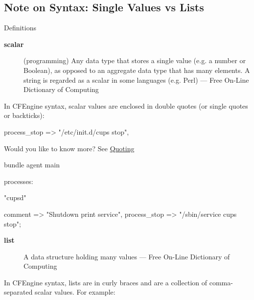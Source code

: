 \subsection{Note on Syntax: Single Values vs Lists}

Definitions

\begin{description}
\item[\textbf{scalar}] (programming) Any data type that stores a single value (e.g. a number or Boolean), as opposed to an aggregate data type that has many elements. A string is regarded as a scalar in some languages (e.g. Perl)  --- Free On-Line Dictionary of Computing
\end{description}

In CFEngine syntax, scalar values are enclosed in double quotes (or single quotes or backticks):

\begin{code}
process_stop => "/etc/init.d/cups stop",
\end{code}

Would you like to know more? See \href{https://docs.cfengine.com/latest/reference-language-concepts-variables.html#quoting}{Quoting}





\begin{aside}
\label{aside:exercise_10}

\begin{code}
bundle agent main
{
  processes:

      "cupsd"

        comment => "Shutdown print service",
        process_stop => "/sbin/service cups stop";

}
\end{code}

\end{aside}





\begin{description}
\item[\textbf{list}] A data structure holding many values --- Free On-Line Dictionary of Computing
\end{description}

In CFEngine syntax, lists are in curly braces and
are a collection of comma-separated scalar values.
For example:

